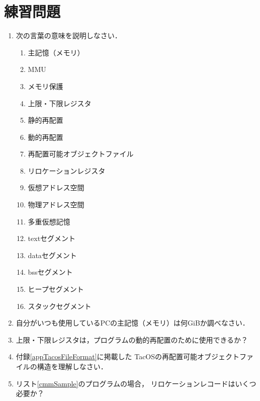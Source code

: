 \section*{練習問題}
\begin{enumerate}
  \renewcommand{\labelenumi}{\ttfamily\arabic{chapter}.\arabic{enumi}}
  \setlength{\leftskip}{1em}
\item 次の言葉の意味を説明しなさい．
  \begin{enumerate}
  \item 主記憶（メモリ）
  \item MMU
  \item メモリ保護
  \item 上限・下限レジスタ
  \item 静的再配置
  \item 動的再配置
  \item 再配置可能オブジェクトファイル
  \item リロケーションレジスタ
  \item 仮想アドレス空間
  \item 物理アドレス空間
  \item 多重仮想記憶
  \item textセグメント
  \item dataセグメント
  \item bssセグメント
  \item ヒープセグメント
  \item スタックセグメント
  \end{enumerate}
\item 自分がいつも使用しているPCの主記憶（メモリ）は何GiBか調べなさい．
\item 上限・下限レジスタは，プログラムの動的再配置のために使用できるか？
\item 付録\ref{appTacosFileFormat}に掲載した
  TacOSの再配置可能オブジェクトファイルの構造を理解しなさい．
\item リスト\ref{cmmSample}のプログラムの場合，
  リロケーションレコードはいくつ必要か？
\end{enumerate}
